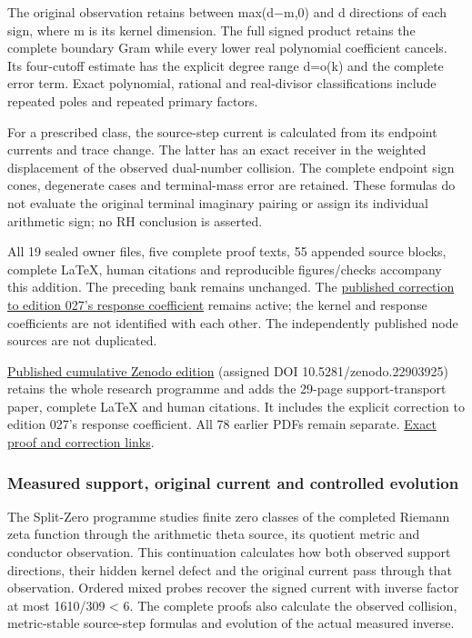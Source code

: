 \documentclass[
]{article}
\begin{document}
The original observation retains between max(d−m,0) and d directions of
each sign, where m is its kernel dimension. The full signed product
retains the complete boundary Gram while every lower real polynomial
coefficient cancels. Its four-cutoff estimate has the explicit degree
range d=o(k) and the complete error term. Exact polynomial, rational and
real-divisor classifications include repeated poles and repeated primary
factors.

For a prescribed class, the source-step current is calculated from its
endpoint currents and trace change. The latter has an exact receiver in
the weighted displacement of the observed dual-number collision. The
complete endpoint sign cones, degenerate cases and terminal-mass error
are retained. These formulas do not evaluate the original terminal
imaginary pairing or assign its individual arithmetic sign; no RH
conclusion is asserted.

All 19 sealed owner files, five complete proof texts, 55 appended source
blocks, complete LaTeX, human citations and reproducible figures/checks
accompany this addition. The preceding bank remains unchanged. The
\href{https://github.com/KokunoYumeto/zeta-function-research-reader/blob/4ba9285b66af58a6d58fc502a494c1fb45ca5b79/workbenches/splitzero-tandem/continuations/20260922-support-transport/CORRECTION_027_RD15.md}{published
correction to edition 027's response coefficient} remains active; the
kernel and response coefficients are not identified with each other. The
independently published node sources are not duplicated.

\href{https://zenodo.org/records/22903925}{Published cumulative Zenodo
edition} (assigned DOI 10.5281/zenodo.22903925) retains the whole
research programme and adds the 29-page support-transport paper,
complete LaTeX and human citations. It includes the explicit correction
to edition 027's response coefficient. All 78 earlier PDFs remain
separate.
\href{https://github.com/KokunoYumeto/zeta-function-research-reader/blob/main/workbenches/splitzero-tandem/continuations/20260922-support-transport-publication/README.md}{Exact
proof and correction links}.

\subsubsection{Measured support, original current and controlled
evolution}\label{measured-support-original-current-and-controlled-evolution}

The Split-Zero programme studies finite zero classes of the completed
Riemann zeta function through the arithmetic theta source, its quotient
metric and conductor observation. This continuation calculates how both
observed support directions, their hidden kernel defect and the original
current pass through that observation. Ordered mixed probes recover the
signed current with inverse factor at most 1610/309 \textless{} 6. The
complete proofs also calculate the observed collision, metric-stable
source-step formulas and evolution of the actual measured inverse.
\end{document}
